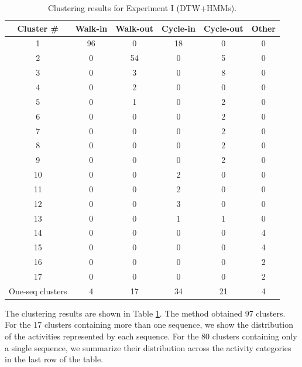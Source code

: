 \begin{table}[t]
  \caption[Clustering results for Experiment I (DTW+HMMs).]{\small
    Clustering results for Experiment I (DTW+HMMs).}
  \label{tab:dtw-and-hmm-assoc-matrix}
  \begin{center}
    \begin{tabular}{c|c|c|c|c|c}
      \hline
      Cluster \# & Walk-in & Walk-out & Cycle-in & Cycle-out & Other \\ 
      \hline \hline
      1  & 96 & 0  & 18 & 0 & 0 \\ \hline
      2  & 0  & 54 & 0  & 5 & 0 \\ \hline
      3  & 0  & 3  & 0  & 8 & 0 \\ \hline
      4  & 0  & 2  & 0  & 0 & 0 \\ \hline
      5  & 0  & 1  & 0  & 2 & 0 \\ \hline
      6  & 0  & 0  & 0  & 2 & 0 \\ \hline
      7  & 0  & 0  & 0  & 2 & 0 \\ \hline
      8  & 0  & 0  & 0  & 2 & 0 \\ \hline
      9  & 0  & 0  & 0  & 2 & 0 \\ \hline
      10 & 0  & 0  & 2  & 0 & 0 \\ \hline
      11 & 0  & 0  & 2  & 0 & 0 \\ \hline
      12 & 0  & 0  & 3  & 0 & 0 \\ \hline
      13 & 0  & 0  & 1  & 1 & 0 \\ \hline
      14 & 0  & 0  & 0  & 0 & 4 \\ \hline
      15 & 0  & 0  & 0  & 0 & 4 \\ \hline
      16 & 0  & 0  & 0  & 0 & 2 \\ \hline
      17 & 0  & 0  & 0  & 0 & 2 \\ \hline
      One-seq clusters & 4 & 17 & 34 & 21 & 4 \\ \hline
    \end{tabular}
  \end{center}
\end{table}

The clustering results are shown in
Table \ref{tab:dtw-and-hmm-assoc-matrix}. The method obtained 97
clusters. For the 17 clusters containing more than one sequence, we
show the distribution of the activities represented by each
sequence. For the 80 clusters containing only a single sequence, we
summarize their distribution across the activity categories in the
last row of the table.

